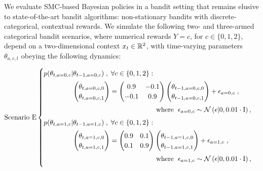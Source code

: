 We evaluate SMC-based Bayesian policies in a bandit setting that remains elusive to state-of-the-art bandit algorithms:
non-stationary bandits with discrete-categorical, contextual rewards.
%
We simulate the following two- and three-armed categorical bandit scenarios,
where numerical rewards $Y=c$, for $c\in\{0,1,2\}$,
depend on a two-dimensional context $x_t\in{\mathbb R}^2$,
with time-varying parameters $\theta_{a,c,t}$
obeying the following dynamics:

\begin{equation}
\text{Scenario E}
\begin{cases}
\vspace*{1ex}
p(\theta_{t,a=0,c}|\theta_{t-1,a=0,c})\;, \; \forall c \in \{0,1,2\}:\\ \vspace*{1ex}
\hspace*{10ex}\begin{pmatrix}
\theta_{t,a=0,c,0}\\
\theta_{t,a=0,c,1}\\
\end{pmatrix} = \begin{pmatrix}
0.9 & -0.1 \\
-0.1 & 0.9 \\
\end{pmatrix} \begin{pmatrix}
\theta_{t-1,a=0,c,0}\\
\theta_{t-1,a=0,c,1}\\
\end{pmatrix} + \epsilon_{a=0,c} \;, \\ \vspace*{1ex}
\hspace*{38ex} \text{where } \; \epsilon_{a=0,c} \sim \N{\epsilon|0,0.01 \cdot\mathrm{I}}, \\

\vspace*{1ex}
p(\theta_{t,a=1,c}|\theta_{t-1,a=1,c})\;, \; \forall c \in \{0,1,2\}:\\ \vspace*{1ex}
\hspace*{10ex}\begin{pmatrix}
\theta_{t,a=1,c,0}\\
\theta_{t,a=1,c,1}\\
\end{pmatrix} = \begin{pmatrix}
0.9 & 0.1 \\
0.1 & 0.9 \\
\end{pmatrix} \begin{pmatrix}
\theta_{t-1,a=1,c,0}\\
\theta_{t-1,a=1,c,1}\\
\end{pmatrix} + \epsilon_{a=1,c} \;, \\ \vspace*{1ex}
\hspace*{38ex} \text{where } \;  \epsilon_{a=1,c} \sim \N{\epsilon|0,0.01 \cdot\mathrm{I}},\\


\end{cases}
\end{equation}
